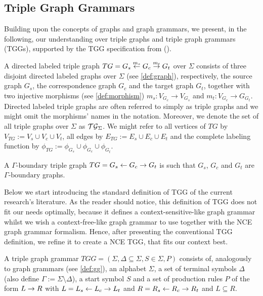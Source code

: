 \documentclass[]{report}
\begin{document}
\subsection{Triple Graph Grammars}
Building upon the concepts of graphs and graph grammars, we present, in the following, our understanding over triple graphs and triple graph grammars (TGGs), supported by the TGG specification from (). %


\begin{definition}
	A directed labeled triple graph $TG = G_s \overset{m_s}{\leftarrow} G_c \overset{m_t}{\rightarrow} G_t$ over $\Sigma$ consists of three disjoint directed labeled graphs over $\Sigma$ (see \ref{def:graph}), respectively, the source graph $G_s$, the correspondence graph $G_c$ and the target graph $G_t$, together with two injective morphisms (see \ref{def:morphism}) $m_s: V_{G_c} \to V_{G_s}$ and $m_t : V_{G_c} \to G_{G_t}$. Directed labeled triple graphs are often referred to simply as triple graphs and we might omit the morphisms' names in the notation. Moreover, we denote the set of all triple graphs over $\Sigma$ as $\mathcal{TG}_{\Sigma}$. We might refer to all vertices of $TG$ by $V_{TG}:= V_s \cup V_c \cup V_t$, all edges by $E_{TG}:= E_s \cup E_c \cup E_t$ and the complete labeling function by $\phi_{TG}:= \phi_{G_s} \cup \phi_{G_c} \cup \phi_{G_t}$.
\end{definition}

\begin{definition}
	A $\Gamma\text{-boundary}$ triple graph $TG = G_s \overset{}{\leftarrow} G_c \overset{}{\rightarrow} G_t$ is such that $G_s$, $G_c$ and $G_t$ are $\Gamma\text{-boundary}$ graphs.
\end{definition}


Below we start introducing the standard definition of TGG of the current research's literature. As the reader should notice, this definition of TGG does not fit our needs optimally, because it defines a context-sensitive-like graph grammar whilst we wish a context-free-like graph grammar to use together with the NCE graph grammar formalism. Hence, after presenting the conventional TGG definition, we refine it to create a NCE TGG, that fits our context best.

\begin{definition}
	A triple graph grammar $TGG = (\Sigma, \Delta \subseteq \Sigma, S \in \Sigma, P)$ consists of, analogously to graph grammars (see \ref{def:gg}), an alphabet $\Sigma$, a set of terminal symbols $\Delta$ (also define $\Gamma := \Sigma \setminus \Delta$), a start symbol $S$ and a set of production rules $P$ of the form $L \to R$ with $L = L_s \overset{}{\leftarrow} L_c \overset{}{\rightarrow} L_t$ and $R = R_s \overset{}{\leftarrow} R_c \overset{}{\rightarrow} R_t$ and $L \subseteq R.$
\end{definition}
\end{document}
